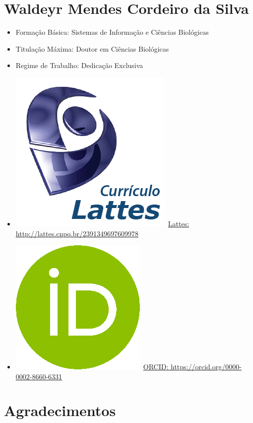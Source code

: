 \documentclass[11pt,fleqn]{book} %
\begin{document}
\section{Waldeyr Mendes Cordeiro da Silva}\label{WaldeyrMendes}
\begin{itemize}
	\item Formação Básica: Sistemas de Informação e Ciências Biológicas
	\item Titulação Máxima: Doutor em Ciências Biológicas
	\item Regime de Trabalho: Dedicação Exclusiva
	\item \includegraphics[scale=.03]{Pictures/lattes}~\href{http://lattes.cnpq.br/2391349697609978}{Lattes: http://lattes.cnpq.br/2391349697609978}
	\item \includegraphics[scale=.15]{Pictures/orcid}~\href{https://orcid.org/0000-0002-8660-6331}{ORCID: https://orcid.org/0000-0002-8660-6331}
\end{itemize}


\newpage
\section*{Agradecimentos}
\end{document}
